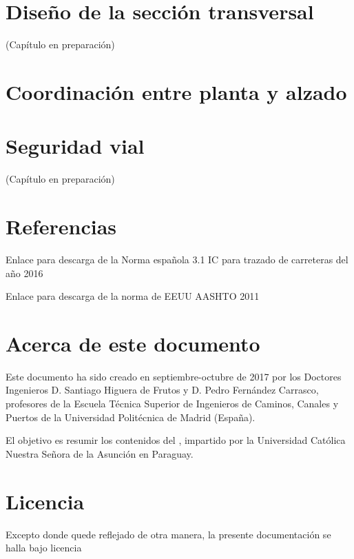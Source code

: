 \documentclass[letterpaper,10pt,english]{sphinxmanual}
\let\sphinxpxdimen\pdfpxdimen\else\newdimen\sphinxpxdimen
\begin{document}
\chapter{Diseño de la sección transversal}
\label{\detokenize{seccion::doc}}\label{\detokenize{seccion:diseno-de-la-seccion-transversal}}
(Capítulo en preparación)


\chapter{Coordinación entre planta y alzado}
\label{\detokenize{coordinacion:coordinacion-entre-planta-y-alzado}}\label{\detokenize{coordinacion::doc}}

\chapter{Seguridad vial}
\label{\detokenize{seguridad:seguridad-vial}}\label{\detokenize{seguridad::doc}}
(Capítulo en preparación)


\chapter{Referencias}
\label{\detokenize{referencias:referencias}}\label{\detokenize{referencias::doc}}
Enlace para descarga de la Norma española 3.1 IC para trazado de carreteras del año 2016



Enlace para descarga de la norma de EEUU AASHTO 2011




\chapter{Acerca de este documento}
\label{\detokenize{index:acerca-de-este-documento}}
Este documento ha sido creado en septiembre-octubre de 2017 por los Doctores Ingenieros D. Santiago Higuera de Frutos y D. Pedro Fernández Carrasco, profesores de la Escuela Técnica Superior de Ingenieros de Caminos, Canales y Puertos de la Universidad Politécnica de Madrid (España).

El objetivo es resumir los contenidos del , impartido por la Universidad Católica Nuestra Señora de la Asunción en Paraguay.


\chapter{Licencia}
\label{\detokenize{index:licencia}}
Excepto donde quede reflejado de otra manera, la presente documentación
se halla bajo licencia 

\noindent\sphinxincludegraphics[width=200\sphinxpxdimen]{{by-sa}.png}



\renewcommand{\indexname}{Index}
\printindex
\end{document}
